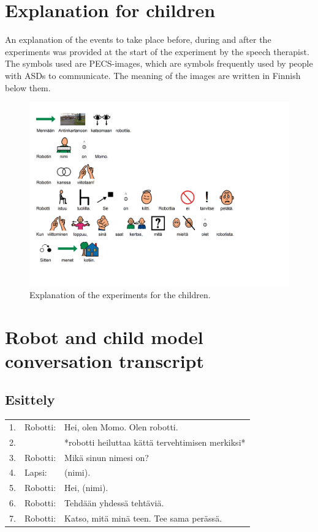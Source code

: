 

\chapter{Explanation for children}
\label{chapter:explanation}

An explanation of the events to take place before, during and after the experiments was provided at the start of the experiment by the speech therapist. The symbols used are PECS-images, which are symbols frequently used by people with ASDs to communicate. The meaning of the images are written in Finnish below them.

\begin{figure}
\centering
  \includegraphics[scale=0.60, angle=-90]{images/kirje_lapselle.pdf}
  \caption{Explanation of the experiments for the children.}
  \label{fig:kirjelapselle}
\end{figure}






\chapter{Robot and child model conversation transcript}
\label{chapter:conversation}


\section{Esittely}
\begin{tabular}{llp{10cm}}
 1. & Robotti: & Hei, olen Momo. Olen robotti. \\
 2. &   & *robotti heiluttaa kättä tervehtimisen merkiksi* \\
 3. & Robotti: & Mikä sinun nimesi on? \\
 4. & Lapsi: & (nimi).\\
 5. & Robotti: & Hei, (nimi).\\
 6. & Robotti: & Tehdään yhdessä tehtäviä.\\
 7. & Robotti: & Katso, mitä minä teen. Tee sama perässä.\\
\end{tabular}

